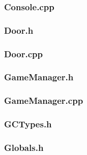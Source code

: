 \documentclass{article}
\begin{document}
\subsubsection{Console.cpp}
	
					
\subsubsection{Door.h}
	

\subsubsection{Door.cpp}
	
 				
\subsubsection{GameManager.h}
	

\subsubsection{GameManager.cpp}
	
	 				
\subsubsection{GCTypes.h}
	
	 				
\subsubsection{Globals.h}
	 
	 				
\end{document}
